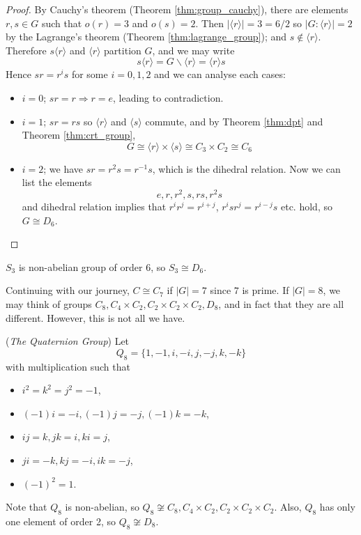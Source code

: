 \documentclass[10pt, a4paper, twoside]{report}
\begin{document}
\begin{proof}
    By Cauchy's theorem (Theorem \ref{thm:group_cauchy}), there are elements \(r,s\in G\) such that \(o(r)=3\) and \(o(s)=2\). Then \(|\langle r\rangle|=3=6/2\) so \(|G:\langle r\rangle|=2\) by the Lagrange's theorem (Theorem \ref{thm:lagrange_group}); and \(s\notin\langle r\rangle\). Therefore \(s\langle r\rangle\) and \(\langle r\rangle\) partition \(G\), and we may write 
    \[s\langle r\rangle=G\backslash\langle r\rangle=\langle r\rangle s\]
    Hence \(sr=r^is\) for some \(i=0,1,2\) and we can analyse each cases:
    \begin{itemize}
        \item \(i=0\); \(sr=r\Rightarrow r=e\), leading to contradiction.
        \item \(i=1\); \(sr=rs\) so \(\langle r\rangle\) and \(\langle s \rangle\) commute, and by Theorem \ref{thm:dpt} and Theorem \ref{thm:crt_group}, 
        \[G\cong\langle r\rangle\times\langle s\rangle\cong C_3\times C_2\cong C_6\]
        \item \(i=2\); we have \(sr=r^2s=r^{-1}s\), which is the dihedral relation. Now we can list the elements
        \[e,r,r^2,s,rs,r^2s\]
        and dihedral relation implies that \(r^ir^j=r^{i+j}\), \(r^isr^j=r^{i-j}s\) etc. hold, so \(G\cong D_6\).
    \end{itemize}
\end{proof}
\begin{remark}
    \(S_3\) is non-abelian group of order 6, so \(S_3\cong D_6\).
\end{remark}
Continuing with our journey, \(C\cong C_7\) if \(|G|=7\) since \(7\) is prime. If \(|G|=8\), we may think of groups \(C_8,C_4\times C_2,C_2\times C_2\times C_2,D_8\), and in fact that they are all different. However, this is not all we have.
\begin{example}
    (\emph{The Quaternion Group}) Let 
    \[Q_8=\{1,-1,i,-i,j,-j,k,-k\}\]
    with multiplication such that 
    \begin{itemize}
        \item \(i^2=k^2=j^2=-1\),
        \item \((-1)i=-i,(-1)j=-j,(-1)k=-k\),
        \item  \(ij=k,jk=i,ki=j\),
        \item \(ji=-k,kj=-i,ik=-j\),
        \item \((-1)^2=1\).
    \end{itemize}
    Note that \(Q_8\) is non-abelian, so \(Q_8\not\cong C_8,C_4\times C_2,C_2\times C_2\times C_2\). Also, \(Q_8\) has only one element of order 2, so \(Q_8\not\cong D_8\).
\end{example}
\end{document}

